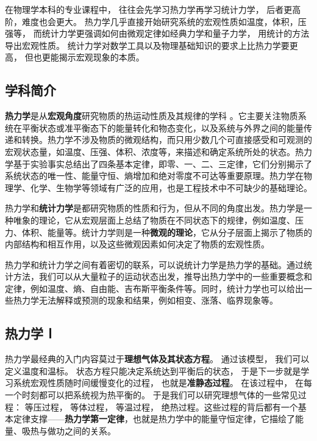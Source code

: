 
\begin{issues}
\issueDraft
\end{issues}


在物理学本科的专业课程中， 往往会先学习热力学再学习统计力学， 后者更高阶，难度也会更大。 热力学几乎直接开始研究系统的宏观性质如温度，体积，压强等， 而统计力学更强调如何由微观定律如经典力学和量子力学， 用统计的方法导出宏观性质。 统计力学对数学工具以及物理基础知识的要求上比热力学要更高， 但也更能揭示宏观现象的本质。

\subsection{学科简介}
\textbf{热力学}是从\textbf{宏观角度}研究物质的热运动性质及其规律的学科 。它主要关注物质系统在平衡状态或准平衡态下的能量转化和物态变化，以及系统与外界之间的能量传递和转换。热力学不涉及物质的微观结构，而只用少数几个可直接感受和可观测的宏观状态量，如温度、压强、体积、浓度等，来描述和确定系统所处的状态。热力学基于实验事实总结出了四条基本定律，即零、一、二、三定律，它们分别揭示了系统状态的唯一性、能量守恒、熵增加和绝对零度不可达等重要原理。热力学在物理学、化学、生物学等领域有广泛的应用，也是工程技术中不可缺少的基础理论。

热力学和\textbf{统计力学}是都研究物质的性质和行为，但从不同的角度出发。热力学是一种唯象的理论，它从宏观层面上总结了物质在不同状态下的规律，例如温度、压力、体积、能量等。统计力学则是一种\textbf{微观的理论}，它从分子层面上揭示了物质的内部结构和相互作用，以及这些微观因素如何决定了物质的宏观性质。

热力学和统计力学之间有着密切的联系，可以说统计力学是热力学的基础。通过统计方法，我们可以从大量粒子的运动状态出发，推导出热力学中的一些重要概念和定律，例如温度、熵、自由能、吉布斯平衡条件等。同时，统计力学也可以给出一些热力学无法解释或预测的现象和结果，例如相变、涨落、临界现象等。


\subsection{热力学 Ⅰ}
热力学最经典的入门内容莫过于\textbf{理想气体及其状态方程}。 通过该模型， 我们可以定义温度和温标。 状态方程只能决定系统达到平衡后的状态， 于是下一步就是学习系统宏观性质随时间缓慢变化的过程， 也就是\textbf{准静态过程}。 在该过程中， 在每一个时刻都可以把系统视为热平衡的。 于是我们可以研究理想气体的一些常见过程： 等压过程， 等体过程， 等温过程， 绝热过程。这些过程的背后都有一个基本定律支撑——\textbf{热力学第一定律}，也就是热力学中的能量守恒定律，它描绘了能量、吸热与做功之间的关系。

